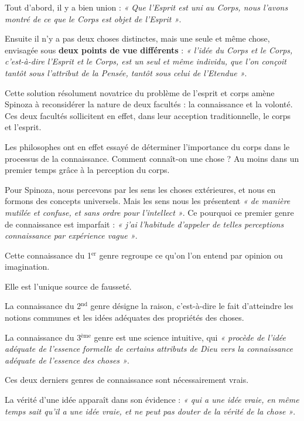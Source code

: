 Tout d’abord, il y a bien union : {\it « Que l’Esprit est uni au Corps, nous l’avons
montré de ce que le Corps est objet de l’Esprit »}.

Ensuite il n’y a pas deux choses distinctes, mais une seule et même chose,
envisagée sous {\bf deux points de vue différents} : {\it « l’idée du Corps et le Corps,
c’est-à-dire l’Esprit et le Corps, est un seul et même individu, que l’on
conçoit tantôt sous l’attribut de la Pensée, tantôt sous celui de l’Etendue »}.

\vspace{0.5cm}
Cette solution résolument novatrice du problème de l’esprit et corps amène
Spinoza à reconsidérer la nature de deux facultés : la connaissance et la
volonté. Ces deux facultés sollicitent en effet, dans leur acception
traditionnelle, le corps et l’esprit.

Les philosophes ont en effet essayé de déterminer l’importance du corps dans
le processus de la connaissance. Comment connaît-on une chose ? Au moins dans
un premier temps grâce à la perception du corps.

Pour Spinoza, nous percevons par les sens les choses extérieures, et nous en
formons des concepts universels. Mais les sens nous les présentent {\it « de manière
mutilée et confuse, et sans ordre pour l’intellect »}. Ce pourquoi ce premier
genre de connaissance est imparfait : {\it « j’ai l’habitude d’appeler de telles
perceptions connaissance par expérience vague »}.

Cette connaissance du {1$^\text{er}$} genre regroupe ce qu’on l’on entend par opinion ou
imagination.

Elle est l’unique source de fausseté.

\vspace{0.5cm}
La connaissance du {2$^\text{nd}$} genre désigne la raison, c’est-à-dire le fait
d’atteindre les notions communes et les idées adéquates des propriétés
des choses.

La connaissance du {3$^\text{ème}$} genre est une science intuitive, qui {\it « procède de
l’idée adéquate de l’essence formelle de certains attributs de Dieu vers
la connaissance adéquate de l’essence des choses »}.

Ces deux derniers genres de connaissance sont nécessairement vrais.

\vspace{0.5cm}
La vérité d’une idée apparaît dans son évidence : {\it « qui a une idée vraie, en
même temps sait qu’il a une idée vraie, et ne peut pas douter de la vérité
de la chose »}.

